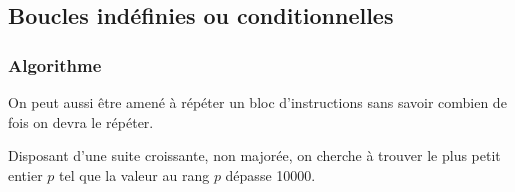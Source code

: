 %
%
%
%
%

\subsection{Boucles indéfinies ou conditionnelles}

\subsubsection{Algorithme}

On peut aussi être amené à répéter un bloc d'instructions sans savoir combien de fois on devra le 
répéter. 

Disposant d'une suite croissante, non majorée, on cherche à trouver le plus petit entier $p$ 
tel que la valeur au rang $p$ dépasse 10000.

